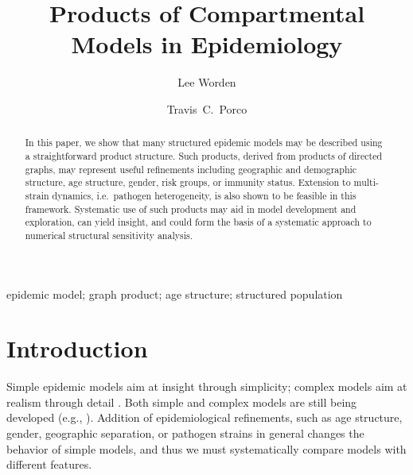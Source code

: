 \documentclass[review]{elsarticle}
\begin{document}
\begin{frontmatter}

\title{Products of Compartmental Models in Epidemiology}

\author[proctor]{Lee Worden}

\author[proctor,ophth,biostat]{Travis~C.~Porco}

\address[proctor]{Francis I. Proctor Foundation, University of California San Francisco, San Francisco, California, USA}
\address[ophth]{Department of Ophthalmology, University of California, San Francisco, California, USA}
\address[biostat]{Department of Epidemiology and Biostatistics, University of California San Francisco, San Francisco, California, USA}

\begin{abstract}
In this paper, we show that many structured epidemic models
may be described using a straightforward product structure.
Such products, derived from products of directed graphs,
may represent useful refinements including geographic and
demographic structure, age structure,
gender, risk groups, or immunity status.
Extension to multi-strain dynamics, i.e.\ pathogen heterogeneity,
is also shown to be feasible in this framework.
Systematic use of such products may aid in model development
and exploration, can yield insight, and
could form the basis of a systematic approach to
numerical structural sensitivity analysis.
\end{abstract}

\begin{keyword}
epidemic model;
graph product;
age structure;
structured population
\end{keyword}

\end{frontmatter}


\section{Introduction}

Simple epidemic models aim at insight through simplicity;
complex models aim at realism through detail \cite{aron1989}.
Both simple
and complex models are still being developed
(e.g., \cite{saadroy-shuai-vandendriessche2016,althaus2015,blumberg-worden-enanoria2015,liu-enanoria-zipprich2015,macal-north-collier2014,merler-ajelli-fumanelli2015}).
Addition of epidemiological refinements, such as 
age structure, gender, geographic separation, or pathogen strains
in general changes the behavior of simple models, and thus we must 
systematically compare models with different features.
\end{document}
